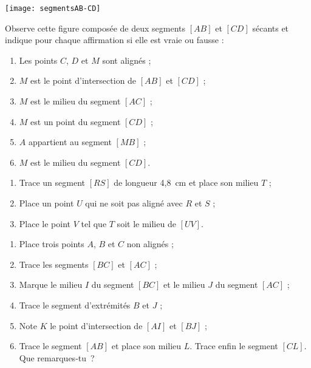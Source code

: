 \begin{exercice}
 \begin{center} \texttt{[image: segmentsAB-CD]}  \end{center}
 Observe cette figure composée de deux segments $[AB]$ et $[CD]$ sécants et indique pour chaque affirmation si elle est vraie ou fausse :
 \begin{enumerate}
  \item Les points $C$, $D$ et $M$ sont alignés ;
  \item $M$ est le point d'intersection de $[AB]$ et $[CD]$ ;
  \item $M$ est le milieu du segment $[AC]$ ;
  \item $M$ est un point du segment $[CD]$ ;
  \item $A$ appartient au segment $[MB]$ ;
  \item $M$ est le milieu du segment $[CD]$.
 \end{enumerate}
\end{exercice}


\begin{exercice}[Milieux]
\begin{enumerate} 
 \item Trace un segment $[RS]$ de longueur 4,8 cm et place son milieu $T$ ;
 \item Place un point $U$ qui ne soit pas aligné avec $R$ et $S$ ;
 \item Place le point $V$ tel que $T$ soit le milieu de $[UV]$.
 \end{enumerate}
\end{exercice}


\begin{exercice}[À construire]
\begin{enumerate} 
 \item Place trois points $A$, $B$ et $C$ non alignés ;
 \item Trace les segments $[BC]$ et $[AC]$ ;
 \item Marque le milieu $I$ du segment $[BC]$ et le milieu $J$ du segment $[AC]$ ;
 \item Trace le segment d'extrémités $B$ et $J$ ;
 \item Note $K$ le point d'intersection de $[AI]$ et $[BJ]$ ;
 \item Trace le segment $[AB]$ et place son milieu $L$. Trace enfin le segment $[CL]$. Que remarques‑tu ?
 \end{enumerate}
\end{exercice}


